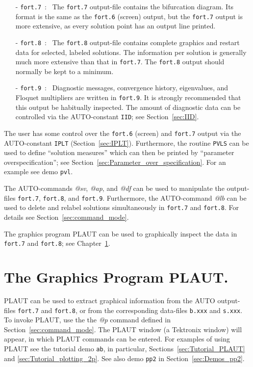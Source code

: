 \documentclass[12pt]{report}
\begin{document}
\begin{itemize}
\item[-] {\tt fort.7}~:~ 
  The {\tt fort.7} output-file contains the bifurcation diagram.
  Its format is the same as the {\tt fort.6} (screen) output, 
  but the {\tt fort.7} output is more extensive, as every solution point has 
  an output line printed.
\item[-] {\tt fort.8}~:~ 
  The {\tt fort.8} output-file contains complete graphics and restart data
  for selected, labeled solutions. 
  The information per solution is generally much more extensive than
  that in {\tt fort.7}. 
  The {\tt fort.8} output should normally be kept to a minimum.
\item[-] {\tt fort.9}~:~
  Diagnostic messages, convergence history, eigenvalues, and 
  Floquet multipliers are written in {\tt fort.9}.
  It is strongly recommended that this output be habitually inspected.
  The amount of diagnostic data can be controlled via the {\cal AUTO}-constant {\tt IID};
  see Section~\ref{sec:IID}.
\end{itemize}

The user has some control over the {\tt fort.6} (screen) and {\tt fort.7} output 
via the {\cal AUTO}-constant {\tt IPLT} (Section~\ref{sec:IPLT}).
Furthermore, the routine {\tt PVLS} can be used to define ``solution measures''
which can then be printed by ``parameter overspecification'';
see Section~\ref{sec:Parameter_over_specification}.
For an example see demo {\tt pvl}.

The {\cal AUTO}-commands {\it @sv}, {\it @ap}, and {\it @df} can be used 
to manipulate  the output-files {\tt fort.7}, {\tt fort.8},
and {\tt fort.9}.
Furthermore, the {\cal AUTO}-command {\it @lb} can be used to delete and
relabel solutions simultaneously in {\tt fort.7} and {\tt fort.8}.
For details see Section~\ref{sec:command_mode}.

The graphics program {\cal PLAUT} can be used to graphically inspect 
the data in {\tt fort.7} and {\tt fort.8}; see Chapter~\ref{ch:PLAUT}.
 
\chapter{ The Graphics Program PLAUT.} \label{ch:PLAUT}
{\cal PLAUT} can be used to extract graphical
information from the {\cal AUTO} output-files {\tt fort.7} and {\tt fort.8},
or from the corresponding data-files {\tt b.xxx} and {\tt s.xxx}.
To invoke {\cal PLAUT}, use the the {\it @p} command defined in 
Section~\ref{sec:command_mode}.
The {\cal PLAUT} window (a Tektronix window) will appear, in which {\cal PLAUT}
commands can be entered.
For examples of using {\cal PLAUT} see the tutorial demo {\tt ab}, in particular,
Sections~\ref{sec:Tutorial_PLAUT} and \ref{sec:Tutorial_plotting_2p}.
See also demo {\tt pp2} in Section~\ref{sec:Demos_pp2}.
\end{document}
